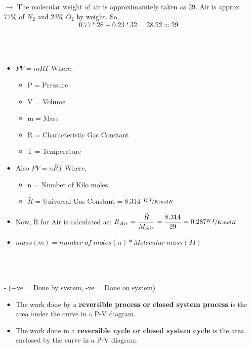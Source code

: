 \documentclass[8pt]{article}
\begin{document}
\begin{center}
\subsection*{}
\end{center}
$\rightarrow$ The molecular weight of air is approximamtely taken as 29. Air is approx 77\% of $N_2$ and 23\% $O_2$ by weight. So,
$$\boxed{0.77 * 28 + 0.23 * 32 = 28.92 \approx 29}$$\\
\\\\
	\begin{itemize}
		\item $PV = mRT$ Where,
		\begin{itemize}
			\item P = Pressure
			\item V = Volume 
			\item m = Mass 
			\item R = Characteristic Gas Constant
			\item T = Temperature
		\end{itemize}
		\item Also $PV = n\bar{R}T$ Where,
		\begin{itemize}
			\item n = Number of Kilo moles
			\item $\bar{R}$ = Universal Gas Constant = 8.314 $\sfrac{KJ}{Kmol K}$			
		\end{itemize}
		\item Now, R for Air is calculated as: $R_{Air} = \dfrac{\bar{R}}{M_{Air}} = \dfrac{8.314}{29} = 0.287 \sfrac{KJ}{Kmol K}$
		\item $\boxed{mass(m) = number\;of\;moles(n) * Molecular\;mass(M)}$\\
	\end{itemize}\hrulefill\\\\
\\ - (+ve = Done by system, -ve = Done on system)
	\begin{itemize}
		\item The work done by a \textbf{reversible process or closed system process} is the area under the curve in a P-V diagram.
		\item The work done in a \textbf{reversible cycle or closed system cycle}    is the area enclosed by the curve in a P-V diagram.
	\end{itemize}
\end{document}
